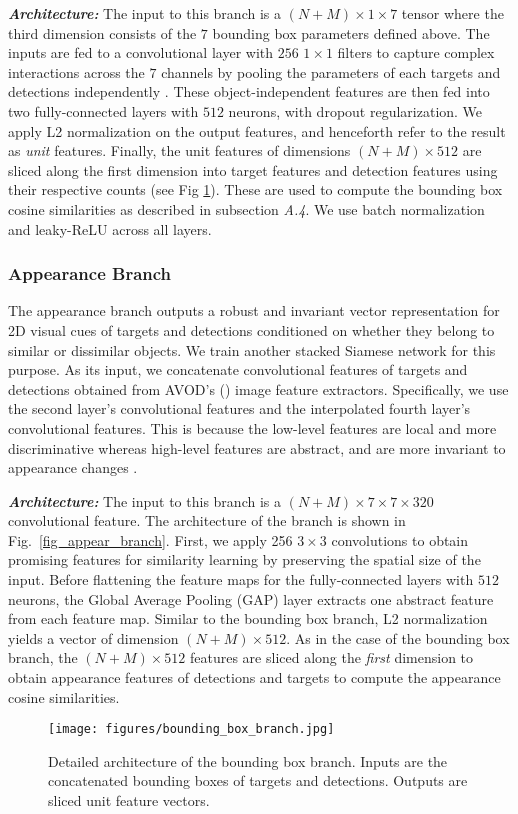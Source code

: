 \documentclass[letterpaper, 10 pt, conference]{ieeeconf}
\begin{document}
\textbf{\textit{Architecture:}} The input to this branch is a $(N+M)\times 1 \times 7$ tensor where the third dimension consists of the $7$ bounding box parameters defined above. The inputs are fed to a convolutional layer with $256$ $1 \times 1$ filters to capture complex interactions across the $7$ channels by pooling the parameters of each targets and detections independently \cite{Net_in_Net}. These object-independent features are then fed into two fully-connected layers with $512$ neurons, with dropout regularization. We apply L2 normalization on the output features, and henceforth refer to the result as \textit{unit} features. Finally, the unit features of dimensions $(N+M)\times512$ are sliced along the first dimension into target features and detection features using their respective counts (see Fig \ref{fig_bbox_branch}). These are used to compute the bounding box cosine similarities as described in subsection \textit{A.4}. We use batch normalization and leaky-ReLU across all layers.

\subsubsection{Appearance Branch}
The appearance branch outputs a robust and invariant vector representation for 2D visual cues of targets and detections conditioned on whether they belong to similar or dissimilar objects. We train another stacked Siamese network for this purpose. As its input, we concatenate convolutional features of targets and detections obtained from AVOD's (\cite{AVOD}) image feature extractors. Specifically, we use the second layer's convolutional features and the interpolated fourth layer's convolutional features. This is because the low-level features are local and more discriminative whereas high-level features are abstract, and are more invariant to appearance changes \cite{CRBM, Visual_conv}.

 \textbf{\textit{Architecture:}} The input to this branch is a $(N+M) \times 7 \times 7 \times 320$ convolutional feature. The architecture of the branch is shown in Fig.~\ref{fig_appear_branch}. First, we apply 256 $3 \times 3$ convolutions to obtain promising features for similarity learning by preserving the spatial size of the input. Before flattening the feature maps for the fully-connected layers with $512$ neurons, the Global Average Pooling (GAP) \cite{lin2013network} layer extracts one abstract feature from each feature map. Similar to the bounding box branch, L2 normalization yields a vector of dimension $(N+M)\times512$. As in the case of the bounding box branch, the $(N+M)\times512$ features are sliced along the \textit{first} dimension to obtain appearance features of detections and targets to compute the appearance cosine similarities.
\begin{figure}[t]
\begin{center}
\texttt{[image: figures/bounding\_box\_branch.jpg]}
\end{center}
\caption{Detailed architecture of the bounding box branch. Inputs are the concatenated bounding boxes of targets and detections. Outputs are sliced unit feature vectors.}
\label{fig_bbox_branch}
\end{figure}
\end{document}
